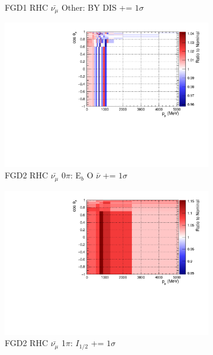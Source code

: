 \begin{figure}
\begin{subfigure}{.32\textwidth}
  \caption{FGD1 RHC $\bar{\nu_{\mu}}$ Other: BY DIS += $1\sigma$}
  \label{fig:sigvar_FGD1_anti-numuCC_other}
\end{subfigure}
\centering
\begin{subfigure}{.32\textwidth}
  \centering
  \includegraphics[width=0.85\linewidth]{figs/sig/FGD2_anti-numuCC_0pi_EB_dial_O_nubar_+1sig.pdf}
  \caption{FGD2 RHC $\bar{\nu_{\mu}}$ 0$\pi$: E$_{b}$ O $\bar{\nu}$ += $1\sigma$}
  \label{fig:sigvar_FGD2_anti-numuCC_0pi}
\end{subfigure}
\begin{subfigure}{.32\textwidth}
  \centering
  \includegraphics[width=0.85\linewidth]{figs/sig/FGD2_anti-numuCC_1pi_ISO_BKG_+1sig.pdf}
  \caption{FGD2 RHC $\bar{\nu_{\mu}}$ 1$\pi$: $I_{1/2}$ += $1\sigma$}
  \label{fig:sigvar_FGD2_anti-numuCC_1pi}
\end{subfigure}
\begin{subfigure}{.32\textwidth}
  \centering

\end{subfigure}
\end{figure}
